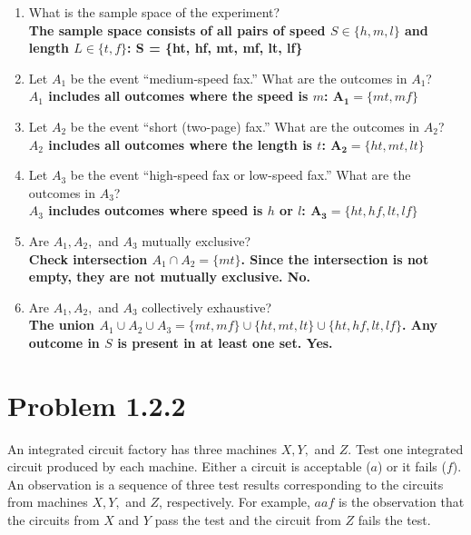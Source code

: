 \documentclass{article}
\begin{document}
\begin{enumerate}[label=(\alph*)]
    \item What is the sample space of the experiment? \\[1em]
    {\boldmath\textbf{The sample space consists of all pairs of speed $S \in \{h, m, l\}$ and length $L \in \{t, f\}$: S = \{ht, hf, mt, mf, lt, lf\}}}
    
    \item Let $A_1$ be the event ``medium-speed fax.'' What are the outcomes in $A_1$? \\[1em]
    {\boldmath\textbf{$A_1$ includes all outcomes where the speed is $m$: $\mathbf{A_1} = \{mt, mf\}$}}
    
    \item Let $A_2$ be the event ``short (two-page) fax.'' What are the outcomes in $A_2$? \\[1em]
    {\boldmath\textbf{$A_2$ includes all outcomes where the length is $t$: $\mathbf{A_2} = \{ht, mt, lt\}$}}
    
    \item Let $A_3$ be the event ``high-speed fax or low-speed fax.'' What are the outcomes in $A_3$? \\[1em]
    {\boldmath\textbf{$A_3$ includes outcomes where speed is $h$ or $l$: $\mathbf{A_3} = \{ht, hf, lt, lf\}$}}
    
    \item Are $A_1, A_2,$ and $A_3$ mutually exclusive? \\[1em]
    {\boldmath\textbf{Check intersection $A_1 \cap A_2 = \{mt\}$. Since the intersection is not empty, they are not mutually exclusive. No.}}
    
    \item Are $A_1, A_2,$ and $A_3$ collectively exhaustive? \\[1em]
    {\boldmath\textbf{The union $A_1 \cup A_2 \cup A_3 = \{mt, mf\} \cup \{ht, mt, lt\} \cup \{ht, hf, lt, lf\}$. Any outcome in $S$ is present in at least one set. Yes.}}
\end{enumerate}

\newpage

\section*{Problem 1.2.2}
An integrated circuit factory has three machines $X, Y,$ and $Z$. Test one integrated circuit produced by each machine. Either a circuit is acceptable ($a$) or it fails ($f$). An observation is a sequence of three test results corresponding to the circuits from machines $X, Y,$ and $Z$, respectively. For example, $aaf$ is the observation that the circuits from $X$ and $Y$ pass the test and the circuit from $Z$ fails the test.
\end{document}
